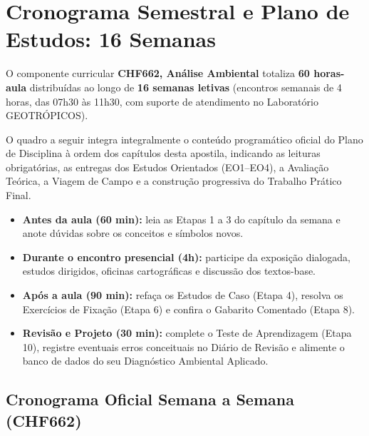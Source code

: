\clearpage
{}
{}
\chapter*{Cronograma Semestral e Plano de Estudos: 16 Semanas}

O componente curricular \textbf{CHF662, Análise Ambiental} totaliza \textbf{60 horas-aula} distribuídas ao longo de \textbf{16 semanas letivas} (encontros semanais de 4 horas, das 07h30 às 11h30, com suporte de atendimento no Laboratório GEOTRÓPICOS).

O quadro a seguir integra integralmente o conteúdo programático oficial do Plano de Disciplina à ordem dos capítulos desta apostila, indicando as leituras obrigatórias, as entregas dos Estudos Orientados (EO1–EO4), a Avaliação Teórica, a Viagem de Campo e a construção progressiva do Trabalho Prático Final.

\begin{boxConceito}
\begin{itemize}[leftmargin=1.5em, itemsep=2.5pt]
  \item \textbf{Antes da aula (60 min):} leia as Etapas 1 a 3 do capítulo da semana e anote dúvidas sobre os conceitos e símbolos novos.
  \item \textbf{Durante o encontro presencial (4h):} participe da exposição dialogada, estudos dirigidos, oficinas cartográficas e discussão dos textos-base.
  \item \textbf{Após a aula (90 min):} refaça os Estudos de Caso (Etapa 4), resolva os Exercícios de Fixação (Etapa 6) e confira o Gabarito Comentado (Etapa 8).
  \item \textbf{Revisão e Projeto (30 min):} complete o Teste de Aprendizagem (Etapa 10), registre eventuais erros conceituais no Diário de Revisão e alimente o banco de dados do seu Diagnóstico Ambiental Aplicado.
\end{itemize}
\end{boxConceito}

\section*{Cronograma Oficial Semana a Semana (CHF662)}

